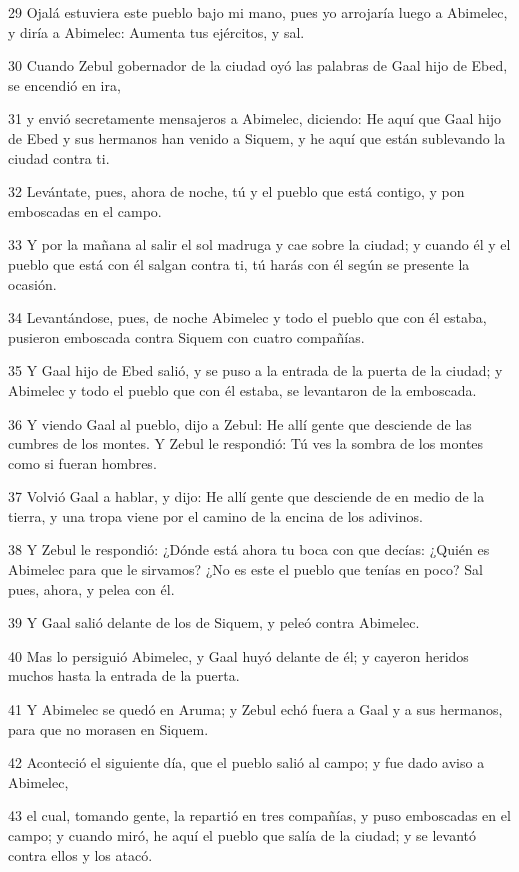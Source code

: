 \par 29 Ojalá estuviera este pueblo bajo mi mano, pues yo arrojaría luego a Abimelec, y diría a Abimelec: Aumenta tus ejércitos, y sal.
\par 30 Cuando Zebul gobernador de la ciudad oyó las palabras de Gaal hijo de Ebed, se encendió en ira,
\par 31 y envió secretamente mensajeros a Abimelec, diciendo: He aquí que Gaal hijo de Ebed y sus hermanos han venido a Siquem, y he aquí que están sublevando la ciudad contra ti.
\par 32 Levántate, pues, ahora de noche, tú y el pueblo que está contigo, y pon emboscadas en el campo.
\par 33 Y por la mañana al salir el sol madruga y cae sobre la ciudad; y cuando él y el pueblo que está con él salgan contra ti, tú harás con él según se presente la ocasión.
\par 34 Levantándose, pues, de noche Abimelec y todo el pueblo que con él estaba, pusieron emboscada contra Siquem con cuatro compañías.
\par 35 Y Gaal hijo de Ebed salió, y se puso a la entrada de la puerta de la ciudad; y Abimelec y todo el pueblo que con él estaba, se levantaron de la emboscada. 
\par 36 Y viendo Gaal al pueblo, dijo a Zebul: He allí gente que desciende de las cumbres de los montes. Y Zebul le respondió: Tú ves la sombra de los montes como si fueran hombres.
\par 37 Volvió Gaal a hablar, y dijo: He allí gente que desciende de en medio de la tierra, y una tropa viene por el camino de la encina de los adivinos.
\par 38 Y Zebul le respondió: ¿Dónde está ahora tu boca con que decías: ¿Quién es Abimelec para que le sirvamos? ¿No es este el pueblo que tenías en poco? Sal pues, ahora, y pelea con él.
\par 39 Y Gaal salió delante de los de Siquem, y peleó contra Abimelec.
\par 40 Mas lo persiguió Abimelec, y Gaal huyó delante de él; y cayeron heridos muchos hasta la entrada de la puerta.
\par 41 Y Abimelec se quedó en Aruma; y Zebul echó fuera a Gaal y a sus hermanos, para que no morasen en Siquem.
\par 42 Aconteció el siguiente día, que el pueblo salió al campo; y fue dado aviso a Abimelec,
\par 43 el cual, tomando gente, la repartió en tres compañías, y puso emboscadas en el campo; y cuando miró, he aquí el pueblo que salía de la ciudad; y se levantó contra ellos y los atacó.
